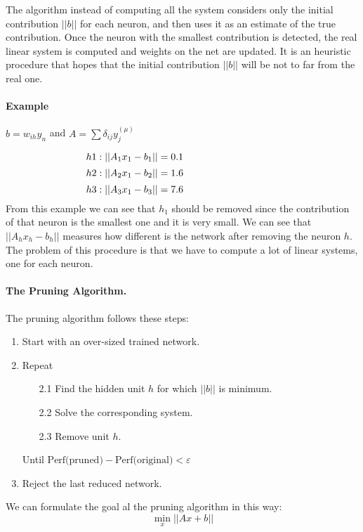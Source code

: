 The  algorithm instead of computing all the system considers only the initial contribution $||b||$ for each neuron, and then uses it as an estimate of the true contribution. Once the neuron with the smallest contribution is detected, the real linear system is computed and weights on the net are updated. It is an heuristic procedure that hopes that the initial contribution $||b||$ will be not to far from the real one.

\paragraph{Example} $b = w_{ih}y_n$ and $A= \sum\delta_{ij}y_j^{(\mu)}$

$$h1: \vert \vert A_1x_1 - b_1 \vert \vert  = 0.1 \hspace{9.7em} $$
$$h2: \vert \vert A_2x_1 - b_2 \vert \vert  = 1.6 \hspace{9.7em} $$
$$h3: \vert \vert A_3x_1 - b_3 \vert \vert  = 7.6 \hspace{9.7em} $$
From this example we can see that $h_1$ should be removed since the contribution of that neuron is the smallest one and it is very small. We can see that $ \vert \vert A_hx_h - b_h\vert \vert$ measures how different is the network after removing the neuron $h$.
The problem of this procedure is that we have to compute a lot of linear systems, one for each neuron.



\paragraph*{The Pruning Algorithm.}
The pruning algorithm follows these steps:
\begin{enumerate}
	\item Start with an over-sized trained network.
	\item Repeat
	\begin{enumerate}
		\item[2.1] Find the hidden unit $h$ for which $\vert \vert b \vert \vert$ is minimum.
		\item[2.2] Solve the corresponding system.
		\item[2.3] Remove unit $h$.
	\end{enumerate}
	Until $\text{Perf(pruned)} - \text{Perf(original)} < \varepsilon$
	\item Reject the last reduced network.
\end{enumerate}
We can formulate the goal al the pruning algorithm in this way:
$$\min_x \vert\vert Ax + b \vert\vert$$
